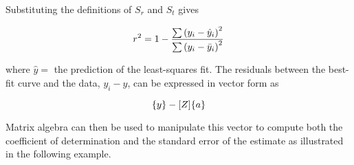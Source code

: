 \documentclass[../main.tex]{subfiles}
\begin{document}
\noindent Substituting the definitions of $S_r$ and $S_t$ gives

\begin{equation}
	\notag
	r^2 = 1 - \frac{\sum {(y_i - \hat{y}_i)} ^ 2}{\sum {(y_i - \bar{y}_i)} ^ 2}
\end{equation}

\noindent where $\hat{y} =$ the prediction of the least-squares fit. The residuals between the best-fit curve and the data, $y_i - \hat{y}$, can be expressed in vector form as

\begin{equation}
	\notag
	\{y\} - [Z] \{a\}
\end{equation}

Matrix algebra can then be used to manipulate this vector to compute both the coefficient of determination and the standard error of the estimate as illustrated in the following example.
\end{document}
